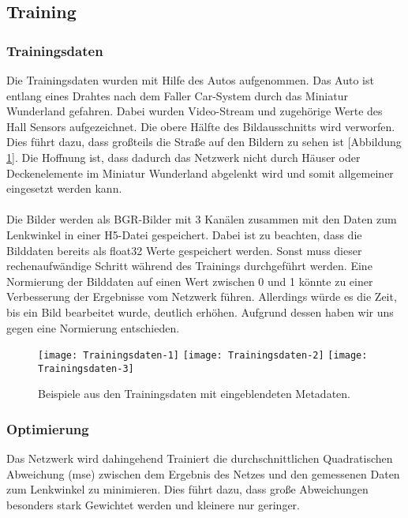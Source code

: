 \documentclass[a4paper, 12pt]{scrartcl}
\begin{document}
			\subsection{Training}
				\subsubsection{Trainingsdaten}
				Die Trainingsdaten wurden mit Hilfe des Autos aufgenommen. Das Auto ist entlang eines Drahtes nach dem Faller Car-System durch das Miniatur Wunderland gefahren. Dabei wurden Video-Stream und zugehörige Werte des Hall Sensors aufgezeichnet. Die obere Hälfte des Bildausschnitts wird verworfen. Dies führt dazu, dass großteils die Straße auf den Bildern zu sehen ist [Abbildung \ref{fig:trainigsdaten}]. Die Hoffnung ist, dass dadurch das Netzwerk nicht durch Häuser oder Deckenelemente im Miniatur Wunderland abgelenkt wird und somit allgemeiner eingesetzt werden kann. \\ \\
				Die Bilder werden als BGR-Bilder mit 3 Kanälen zusammen mit den Daten zum Lenkwinkel in einer H5-Datei gespeichert. Dabei ist zu beachten, dass die Bilddaten bereits als float32 Werte gespeichert werden. Sonst muss dieser rechenaufwändige Schritt während des Trainings durchgeführt werden. Eine Normierung der Bilddaten auf einen Wert zwischen 0 und 1 könnte zu einer Verbesserung der Ergebnisse vom Netzwerk führen. Allerdings würde es die Zeit, bis ein Bild bearbeitet wurde, deutlich erhöhen. Aufgrund dessen haben wir uns gegen eine Normierung entschieden.
				
				\begin{figure}[h!]
				   	 \centering
   					 \texttt{[image: Trainingsdaten-1]}
					 \texttt{[image: Trainingsdaten-2]}
					 \texttt{[image: Trainingsdaten-3]}
  					  \caption{Beispiele aus den Trainingsdaten mit eingeblendeten Metadaten.}
 					   \label{fig:trainigsdaten}
				\end{figure}
				
				\subsubsection{Optimierung}
				Das Netzwerk wird dahingehend Trainiert die durchschnittlichen Quadratischen Abweichung (mse) zwischen dem Ergebnis des Netzes und den gemessenen Daten zum Lenkwinkel zu minimieren. Dies führt dazu, dass große Abweichungen besonders stark Gewichtet werden und kleinere nur geringer. 
		
\end{document}
